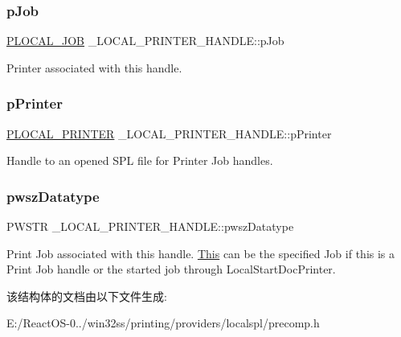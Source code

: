 \subsubsection{\texorpdfstring{p\+Job}{pJob}}
{\footnotesize\ttfamily \hyperlink{struct___l_o_c_a_l___j_o_b}{P\+L\+O\+C\+A\+L\+\_\+\+J\+OB} \+\_\+\+L\+O\+C\+A\+L\+\_\+\+P\+R\+I\+N\+T\+E\+R\+\_\+\+H\+A\+N\+D\+L\+E\+::p\+Job}

Printer associated with this handle. \mbox{\label{struct___l_o_c_a_l___p_r_i_n_t_e_r___h_a_n_d_l_e_a308a9179f288674e32e6e2764025ff36}} 
\subsubsection{\texorpdfstring{p\+Printer}{pPrinter}}
{\footnotesize\ttfamily \hyperlink{struct___l_o_c_a_l___p_r_i_n_t_e_r}{P\+L\+O\+C\+A\+L\+\_\+\+P\+R\+I\+N\+T\+ER} \+\_\+\+L\+O\+C\+A\+L\+\_\+\+P\+R\+I\+N\+T\+E\+R\+\_\+\+H\+A\+N\+D\+L\+E\+::p\+Printer}

Handle to an opened S\+PL file for Printer Job handles. \mbox{\label{struct___l_o_c_a_l___p_r_i_n_t_e_r___h_a_n_d_l_e_af402420bacad53674d38dc8ca8b2ed3f}} 
\subsubsection{\texorpdfstring{pwsz\+Datatype}{pwszDatatype}}
{\footnotesize\ttfamily P\+W\+S\+TR \+\_\+\+L\+O\+C\+A\+L\+\_\+\+P\+R\+I\+N\+T\+E\+R\+\_\+\+H\+A\+N\+D\+L\+E\+::pwsz\+Datatype}

Print Job associated with this handle. \hyperlink{namespace_this}{This} can be the specified Job if this is a Print Job handle or the started job through Local\+Start\+Doc\+Printer. 

该结构体的文档由以下文件生成\+:\begin{DoxyCompactItemize}
\item 
E\+:/\+React\+O\+S-\/0../win32ss/printing/providers/localspl/precomp.\+h\end{DoxyCompactItemize}

